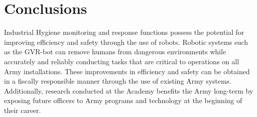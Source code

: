 \section{Conclusions}\label{conclusions}
Industrial Hygiene monitoring and response functions possess the potential for improving efficiency and safety through the use of robots. Robotic systems such as the GVR-bot can remove humans from dangerous environments while accurately and reliably conducting tasks that are critical to operations on all Army installations. These improvements in efficiency and safety can be obtained in a fiscally responsible manner through the use of existing Army systems. Additionally, research conducted at the Academy benefits the Army long-term by exposing future officers to Army programs and technology at the beginning of their career.